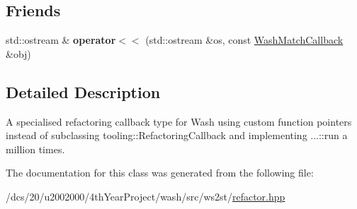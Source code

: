 \subsection*{Friends}
\begin{DoxyCompactItemize}
\item 
\mbox{\label{classws2st_1_1refactor_1_1WashMatchCallback_a0038f6cb22cb01fa32430f4857862513}} 
std\+::ostream \& {\bfseries operator$<$$<$} (std\+::ostream \&os, const \mbox{\hyperlink{classws2st_1_1refactor_1_1WashMatchCallback}{Wash\+Match\+Callback}} \&obj)
\end{DoxyCompactItemize}


\subsection{Detailed Description}
A specialised refactoring callback type for Wash using custom function pointers instead of subclassing tooling\+::\+Refactoring\+Callback and implementing ...\+::run a million times. 

The documentation for this class was generated from the following file\+:\begin{DoxyCompactItemize}
\item 
/dcs/20/u2002000/4th\+Year\+Project/wash/src/ws2st/\mbox{\hyperlink{refactor_8hpp}{refactor.\+hpp}}\end{DoxyCompactItemize}
